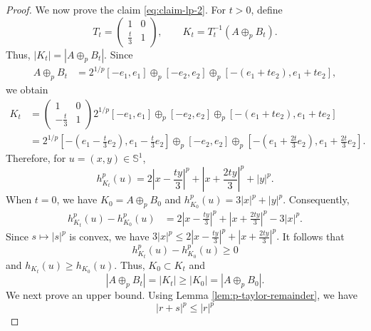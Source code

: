 \documentclass[11pt,a4paper]{amsart}
\theoremstyle{plain}
\theoremstyle{definition}
\begin{document}
\begin{proof}
    We now prove the claim \eqref{eq:claim-lp-2}. For \(t>0\), define
\[
    T_t=
    \begin{pmatrix}
        1&0\\
        \frac{t}{3}&1
    \end{pmatrix},
    \qquad
    K_t=T_t^{-1}(A\oplus_pB_t).
\]
Thus, $ |K_t|=|A\oplus_pB_t|. $ Since 
\[
\begin{aligned}
    A\oplus_pB_t
    &=
    2^{1/p}[-e_1,e_1]
    \oplus_p[-e_2,e_2]\oplus_p
    [-(e_1+te_2),e_1+te_2],
\end{aligned}
\]
we obtain
\[
\begin{aligned}
    K_t&=  \begin{pmatrix}
        1&0\\
        -\frac{t}{3}&1
    \end{pmatrix}
    2^{1/p}[-e_1,e_1]
    \oplus_p[-e_2,e_2]\oplus_p
    [-(e_1+te_2),e_1+te_2]
    \\
    &=
    2^{1/p}
    \left[
        -\left(e_1-\frac{t}{3}e_2\right),
        e_1-\frac{t}{3}e_2
    \right]
    \oplus_p[-e_2,e_2]\oplus_p
    \left[
        -\left(e_1+\frac{2t}{3}e_2\right),
        e_1+\frac{2t}{3}e_2
    \right].
\end{aligned}
\]
Therefore, for \(u=(x,y)\in\mathbb S^1\),
\[
    h_{K_t}^p(u)
    =
    2\left|x-\frac{ty}{3}\right|^p
    +
    \left|x+\frac{2ty}{3}\right|^p
    +
    |y|^p.
\]
When \(t=0\), we have $K_0=A\oplus_pB_0$ and $h_{K_0}^p(u)=3|x|^p+|y|^p$.
Consequently,
\begin{equation}
    \label{eq:support-p-difference}
\begin{aligned}
    h_{K_t}^p(u)-h_{K_0}^p(u)
    &=
    2\left|x-\frac{ty}{3}\right|^p
    +
    \left|x+\frac{2ty}{3}\right|^p
    -
    3|x|^p.
\end{aligned}
\end{equation}
Since \(s\mapsto |s|^p\) is convex, we have
\(
    3|x|^p
    \leq
    2\left|x-\frac{ty}{3}\right|^p
    +
    \left|x+\frac{2ty}{3}\right|^p.
\)
It follows that
\begin{equation}
    \label{eq:support-p-positive}
    h_{K_t}^p(u)-h_{K_0}^p(u)\geq0
\end{equation}
and $ h_{K_t}(u)\geq h_{K_0}(u).$ 
Thus, $K_0 \subset K_t$ and 
\begin{equation}\label{lowebound}
    |A\oplus_pB_t|=|K_t|\ge |K_0| = |A\oplus_pB_0|.
    \end{equation}
We next prove an upper bound. 
Using Lemma \ref{lem:p-taylor-remainder}, we have
$$
        |r+s|^p \le |r|^p
$$
\end{proof}
\end{document}

